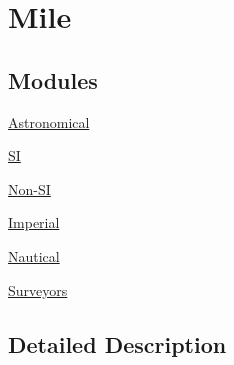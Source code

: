 \hypertarget{group___e_g_x_math-_conversions-_length_conversions-_imperial-_mile}{}\section{Mile}
\label{group___e_g_x_math-_conversions-_length_conversions-_imperial-_mile}
\subsection*{Modules}
\begin{DoxyCompactItemize}
\item 
\mbox{\hyperlink{group___e_g_x_math-_conversions-_length_conversions-_imperial-_mile-_astronomical}{Astronomical}}
\item 
\mbox{\hyperlink{group___e_g_x_math-_conversions-_length_conversions-_imperial-_mile-_s_i}{SI}}
\item 
\mbox{\hyperlink{group___e_g_x_math-_conversions-_length_conversions-_imperial-_mile-_non-_s_i}{Non-\/\+SI}}
\item 
\mbox{\hyperlink{group___e_g_x_math-_conversions-_length_conversions-_imperial-_mile-_imperial}{Imperial}}
\item 
\mbox{\hyperlink{group___e_g_x_math-_conversions-_length_conversions-_imperial-_mile-_nautical}{Nautical}}
\item 
\mbox{\hyperlink{group___e_g_x_math-_conversions-_length_conversions-_imperial-_mile-_surveyors}{Surveyors}}
\end{DoxyCompactItemize}


\subsection{Detailed Description}
